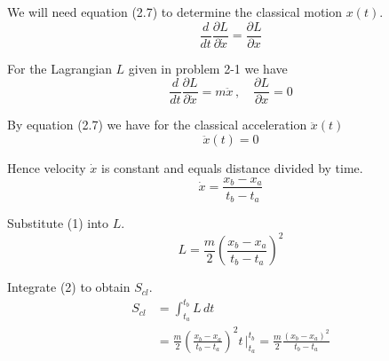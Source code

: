 


\bigskip
We will need equation (2.7) to determine the classical motion $x(t)$.
\begin{equation*}
\frac{d}{dt}\frac{\partial L}{\partial\dot x}=\frac{\partial L}{\partial x}
\tag{2.7}
\end{equation*}

For the Lagrangian $L$ given in problem 2-1 we have
\begin{equation*}
\frac{d}{dt}\frac{\partial L}{\partial\dot x}=m\ddot x\,, %
\quad
\frac{\partial L}{\partial x}=0
\end{equation*}

By equation (2.7) we have for the classical acceleration $\ddot x(t)$
\begin{equation*}
\ddot x(t)=0
\end{equation*}

Hence velocity $\dot x$ is constant and equals distance divided by time.
\begin{equation*}
\dot x=\frac{x_b-x_a}{t_b-t_a}
\tag{1}
\end{equation*}

Substitute (1) into $L$.
\begin{equation*}
L=\frac{m}{2}\left(\frac{x_b-x_a}{t_b-t_a}\right)^2
\tag{2}
\end{equation*}

Integrate (2) to obtain $S_{cl}$.
\begin{align*}
S_{cl}
&=\int_{t_a}^{t_b}L\,dt
\\
&=\frac{m}{2}\left(\frac{x_b-x_a}{t_b-t_a}\right)^2 t\,\bigg|_{t_a}^{t_b}
=\frac{m}{2}\frac{(x_b-x_a)^2}{t_b-t_a}
\end{align*}


